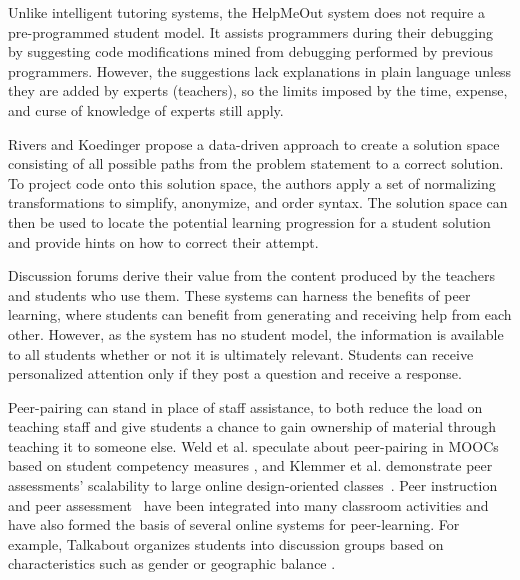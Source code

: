 Unlike intelligent tutoring systems, the HelpMeOut system \cite{helpmeout} does not require a pre-programmed student model. It assists programmers during their debugging by suggesting code modifications mined from debugging performed by previous programmers. However, the suggestions lack explanations in plain language unless they are added by experts (teachers), so the limits imposed by the time, expense, and curse of knowledge of experts still apply.

Rivers and Koedinger \cite{riversaied} propose a data-driven approach to create a solution space consisting of all possible paths from the problem statement to a correct solution. To project code onto this solution space, the authors apply a set of normalizing transformations to simplify, anonymize, and order syntax. The solution space can then be used to locate the potential learning progression for a student solution and provide hints on how to correct their attempt.

Discussion forums derive their value from the content produced by the teachers and students who use them. These systems can harness the benefits of peer learning, where students can benefit from generating and receiving help from each other. However, as the system has no student model, the information is available to all students whether or not it is ultimately relevant. Students can receive personalized attention only if they post a question and receive a response. 

Peer-pairing can stand in place of staff assistance, to both reduce the load on teaching staff and give students a chance to gain ownership of material through teaching it to someone else. Weld et al. speculate about peer-pairing in MOOCs based on student competency measures \cite{WeldHcomp12}, and Klemmer et al. demonstrate peer assessments' scalability to large online design-oriented classes~\cite{Klemmer}. Peer instruction~\cite{mazur} and peer assessment~\cite{peerassessment} have been integrated into many classroom activities and have also formed the basis of several online systems for peer-learning. For example, Talkabout organizes students into discussion groups based on characteristics such as gender or geographic balance \cite{talkabout}.

